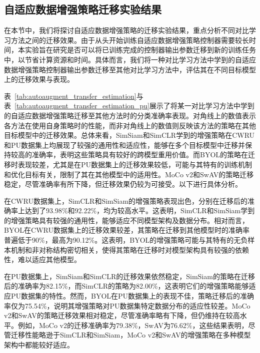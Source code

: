 \documentclass[master]{thesis-uestc}
\begin{document}
\FloatBarrier  %

\subsection{自适应数据增强策略迁移实验结果}
在本节中，我们将探讨自适应数据增强策略的迁移实验结果，重点分析不同对比学习方法之间的迁移效果。由于从头开始训练自适应数据增强策略控制器需要较长时间，本实验旨在研究是否可以将已训练完成的控制器输出参数迁移到新的训练任务中，以节省计算资源和时间。具体而言，我们将一种对比学习方法中学到的自适应数据增强策略控制器输出参数迁移至其他对比学习方法中，评估其在不同目标模型上的迁移效果与表现。

表~\ref{tab:autoaugment_transfer_estimation}与表~\ref{tab:autoaugment_transfer_estimation_pu}展示了将某一对比学习方法中学到的自适应数据增强策略迁移至其他方法时的分类准确率表现。对角线上的数值表示各方法在使用自身策略时的性能，而非对角线上的数值则反映该方法的策略在其他目标模型中的迁移效果。总体来看，SimSiam和SimCLR学到的增强策略在CWRU和PU数据集上均展现了较强的通用性和适应性，能够在多个目标模型中迁移并保持较高的准确率，表明这些策略具有较好的跨模型重用价值。而BYOL的策略在迁移时表现较差，尤其是在PU数据集上的迁移效果较低，可能与其特有的训练机制和优化目标有关，限制了其在其他模型中的适用性。MoCo v2和SwAV的策略迁移稳定，尽管准确率有所下降，但迁移效果仍较为可接受。以下进行具体分析。

在CWRU数据集上，SimCLR和SimSiam的增强策略表现出色，分别在迁移后的准确率上达到了93.98\%和92.22\%，均为较高水平。这表明，SimCLR和SimSiam学到的增强策略具有较强的通用性，能够适应不同模型架构及数据分布。相对而言，BYOL在CWRU数据集上的迁移效果较差，其策略在迁移到其他模型时的准确率普遍低于90\%，最高为90.12\%。这表明，BYOL的增强策略可能与其特有的无负样本机制和非对称结构密切相关，使得其策略在迁移时对模型架构具有较强的依赖性，难以适应其他模型。

在PU数据集上，SimSiam和SimCLR的迁移效果依然稳定，SimSiam的策略在迁移后的准确率为82.15\%，而SimCLR的策略为82.00\%，这表明它们的增强策略能够适应PU数据集的特性。然而，BYOL在PU数据集上的表现不佳，策略迁移后的准确率仅为75.54\%，说明其增强策略对PU数据集特定数据分布的适应性较差。MoCo v2和SwAV的策略迁移效果相对稳定，尽管准确率略有下降，但仍维持在较高水平。例如，MoCo v2的迁移准确率为79.38\%，SwAV为76.62\%，这些结果表明，尽管迁移性能略逊于SimCLR和SimSiam，MoCo v2和SwAV的增强策略在多种模型架构中都能较好适应。
\end{document}
